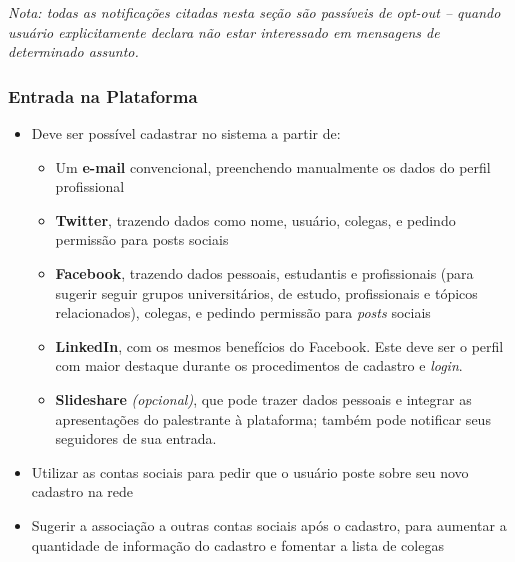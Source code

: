 \documentclass[12pt,a4paper,twoside,hyphens,english,brazil]{abntex2}
\begin{document}
\textit{Nota: todas as notificações citadas nesta seção são passíveis de opt-out -- quando usuário explicitamente declara não estar interessado em mensagens de determinado assunto.}

\subsubsection*{Entrada na Plataforma}
\begin{itemize}
\item Deve ser possível cadastrar no sistema a partir de:
	\begin{itemize} %
		\item Um \textbf{e-mail} convencional, preenchendo manualmente os dados do perfil profissional
		\item \textbf{Twitter}, trazendo dados como nome, usuário, colegas, e pedindo permissão para posts sociais %
		\item \textbf{Facebook}, trazendo dados pessoais, estudantis e profissionais (para sugerir seguir grupos universitários, de estudo, profissionais e tópicos relacionados), colegas, e pedindo permissão para \emph{posts} sociais %
		\item \textbf{LinkedIn}, com os mesmos benefícios do Facebook. Este deve ser o perfil com maior destaque durante os procedimentos de cadastro e \emph{login}.
		\item \textbf{Slideshare} \textit{(opcional)}, que pode trazer dados pessoais e integrar as apresentações do palestrante à plataforma; também pode notificar seus seguidores de sua entrada.
	\end{itemize}
\item Utilizar as contas sociais para pedir que o usuário poste sobre seu novo cadastro na rede
\item Sugerir a associação a outras contas sociais após o cadastro, para aumentar a quantidade de informação do cadastro e fomentar a lista de colegas
\end{itemize}
\end{document}
